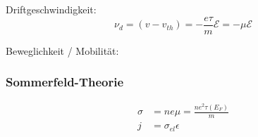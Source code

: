 Driftgeschwindigkeit:
\begin{equation*}
    \nu_d = (v-v_{th}) = -\frac{e \tau}{m} \mathcal{E} = -\mu \mathcal{E}
\end{equation*}

Beweglichkeit / Mobilität:
\subsubsection*{Sommerfeld-Theorie}

\begin{equation*}
    \begin{aligned}
        \sigma &= n e \mu = \frac{n e^2 \tau(E_F)}{m} \\
        j &= \sigma_{el} \epsilon
    \end{aligned}
\end{equation*}